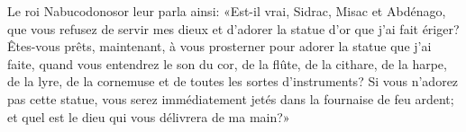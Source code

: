 Le roi Nabucodonosor leur parla ainsi:
	«Est-il vrai, Sidrac, Misac et Abdénago, que vous refusez de servir mes dieux
	et d’adorer la statue d’or que j’ai fait ériger?
Êtes-vous prêts, maintenant, à vous prosterner pour adorer la statue que j’ai faite,
	quand vous entendrez le son du cor, de la flûte, de la cithare, de la harpe,
	de la lyre, de la cornemuse et de toutes les sortes d’instruments?
Si vous n’adorez pas cette statue,
	vous serez immédiatement jetés dans la fournaise de feu ardent;
	et quel est le dieu qui vous délivrera de ma main?»
